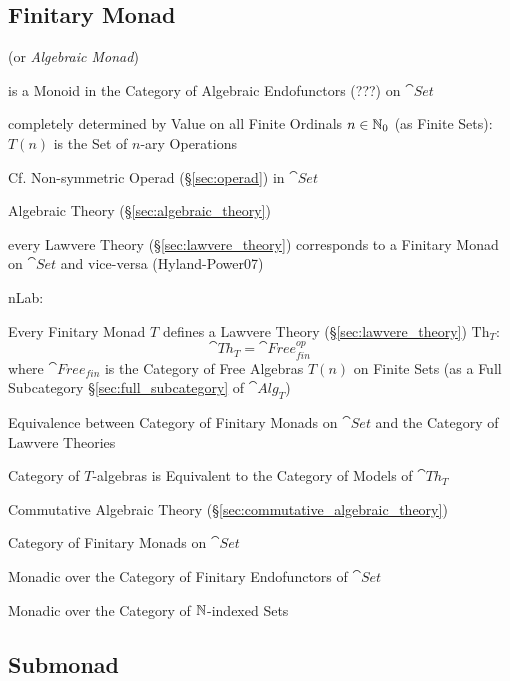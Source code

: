 \subsection{Finitary Monad}\label{sec:finitary_monad}

(or \emph{Algebraic Monad})

is a Monoid in the Category of Algebraic Endofunctors (???) on
$\cat{Set}$

completely determined by Value on all Finite Ordinals $n \in \mathbb{N}_0$
(as Finite Sets): $T(n)$ is the Set of $n$-ary Operations

\fist Cf. Non-symmetric Operad (\S\ref{sec:operad}) in
$\cat{Set}$


\asterism


Algebraic Theory (\S\ref{sec:algebraic_theory})

every Lawvere Theory (\S\ref{sec:lawvere_theory}) corresponds to a Finitary
Monad on $\cat{Set}$ and vice-versa (Hyland-Power07)

nLab:

Every Finitary Monad $T$ defines a Lawvere Theory (\S\ref{sec:lawvere_theory})
$\mathrm{Th}_T$:
\[
  \cat{Th}_T = \cat{Free}^{op}_{fin}
\]
where $\cat{Free}_{fin}$ is the Category of Free Algebras $T(n)$ on
Finite Sets (as a Full Subcategory \S\ref{sec:full_subcategory} of
$\cat{Alg}_T$) %

Equivalence between Category of Finitary Monads on $\cat{Set}$ and the
Category of Lawvere Theories %

Category of $T$-algebras is Equivalent to the Category of Models of
$\cat{Th}_T$ %

Commutative Algebraic Theory
(\S\ref{sec:commutative_algebraic_theory})

Category of Finitary Monads on $\cat{Set}$

Monadic over the Category of Finitary Endofunctors of $\cat{Set}$

Monadic over the Category of $\mathbb{N}$-indexed Sets



\subsection{Submonad}\label{sec:submonad}

